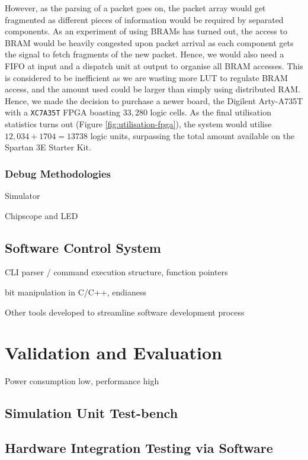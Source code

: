 \documentclass[a4paper]{report}
\newcommand{\code}{\texttt}
\begin{document}
However, as the parsing of a packet goes on, the packet array would get fragmented as different pieces of information would be required by separated components. As an experiment of using BRAMs has turned out, the access to BRAM would be heavily congested upon packet arrival as each component gets the signal to fetch fragments of the new packet. Hence, we would also need a FIFO at input and a dispatch unit at output to organise all BRAM accesses. This is considered to be inefficient as we are wasting more LUT to regulate BRAM access, and the amount used could be larger than simply using distributed RAM. Hence, we made the decision to purchase a newer board, the Digilent Arty-A735T with a \code{XC7A35T} FPGA boasting $33,280$ logic cells. As the final utilisation statistics turns out (Figure \ref{fig:utilisation-fpga}), the system would utilise $12,034 + 1704 = 13738$ logic units, surpassing the total amount available on the Spartan 3E Starter Kit.


\newpage


\subsection{Debug Methodologies}

Simulator

Chipscope and LED

\newpage

\section{Software Control System}

CLI parser / command execution structure, function pointers

bit manipulation in C/C++, endianess

Other tools developed to streamline software development process

\chapter{Validation and Evaluation}

Power consumption low, performance high

\section{Simulation Unit Test-bench}

\section{Hardware Integration Testing via Software}
\end{document}
